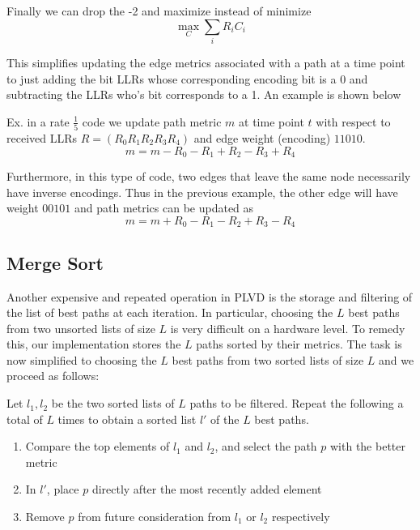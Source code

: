 Finally we can drop the -2 and maximize instead of minimize
$$\max_C \sum_i R_i C_i $$

This simplifies updating the edge metrics associated with a path at a time point to just adding the bit LLRs whose corresponding encoding bit is a $0$ and subtracting the LLRs who’s bit corresponds to a 1. An example is shown below

Ex. in a rate $\frac{1}{5}$ code we update path metric $m$ at time point $t$ with respect to received LLRs $R = (R_0 R_1 R_2 R_3 R_4)$ and edge weight (encoding) $11010$.
$$m = m - R_0 - R_1 + R_2 - R_3 + R_4$$

Furthermore, in this type of code, two edges that leave the same node necessarily have inverse encodings. Thus in the previous example, the other edge will have weight $00101$ and path metrics can be updated as
$$m = m + R_0 - R_1 - R_2 + R_3 - R_4$$

\subsection{Merge Sort}
Another expensive and repeated operation in PLVD is the storage and filtering of the list of best paths at each iteration. In particular, choosing the $L$ best paths from two unsorted lists of size $L$ is very difficult on a hardware level. To remedy this, our implementation stores the $L$ paths sorted by their metrics. The task is now simplified to choosing the $L$ best paths from two sorted lists of size $L$ and we proceed as follows:

\vspace{5pt}

Let $l_1, l_2$ be the two sorted lists of $L$ paths to be filtered. Repeat the following a total of $L$ times to obtain a sorted list $l'$ of the $L$ best paths.
\begin{enumerate}
    \item Compare the top elements of $l_1$ and $l_2$, and select the path $p$ with the better metric
    \item In $l'$, place $p$ directly after the most recently added element
    \item Remove $p$ from future consideration from $l_1$ or $l_2$ respectively
\end{enumerate}

